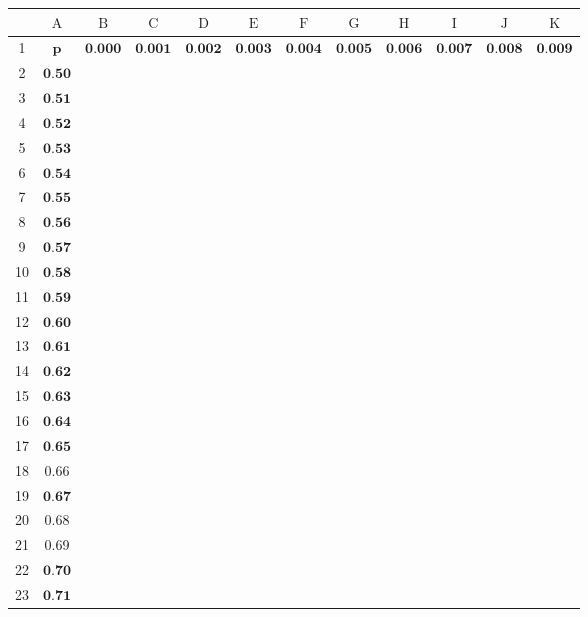\documentclass[10pt]{article}
\begin{document}
\begin{CJK*}{UTF8}{bsmi}
\begin{center}
\begin{tabular}{|c|c|c|c|c|c|c|c|c|c|c|c|}
\hline
 & $\mathrm{A}$ & $\mathrm{B}$ & $\mathrm{C}$ & $\mathrm{D}$ & $\mathrm{E}$ & $\mathrm{F}$ & $\mathrm{G}$ & $\mathrm{H}$ & $\mathrm{I}$ & $\mathrm{J}$ & $\mathrm{K}$ \\
\hline
1 & $\boldsymbol{p}$ & $\mathbf{0 . 0 0 0}$ & $\mathbf{0 . 0 0 1}$ & $\mathbf{0 . 0 0 2}$ & $\mathbf{0 . 0 0 3}$ & $\mathbf{0 . 0 0 4}$ & $\mathbf{0 . 0 0 5}$ & $\mathbf{0 . 0 0 6}$ & $\mathbf{0 . 0 0 7}$ & $\mathbf{0 . 0 0 8}$ & $\mathbf{0 . 0 0 9}$ \\
\hline
2 & $\mathbf{0 . 5 0}$ &  &  &  &  &  &  &  &  &  &  \\
\hline
3 & $\mathbf{0 . 5 1}$ &  &  &  &  &  &  &  &  &  &  \\
\hline
4 & $\mathbf{0 . 5 2}$ &  &  &  &  &  &  &  &  &  &  \\
\hline
5 & $\mathbf{0 . 5 3}$ &  &  &  &  &  &  &  &  &  &  \\
\hline
6 & $\mathbf{0 . 5 4}$ &  &  &  &  &  &  &  &  &  &  \\
\hline
7 & $\mathbf{0 . 5 5}$ &  &  &  &  &  &  &  &  &  &  \\
\hline
8 & $\mathbf{0 . 5 6}$ &  &  &  &  &  &  &  &  &  &  \\
\hline
9 & $\mathbf{0 . 5 7}$ &  &  &  &  &  &  &  &  &  &  \\
\hline
10 & $\mathbf{0 . 5 8}$ &  &  &  &  &  &  &  &  &  &  \\
\hline
11 & $\mathbf{0 . 5 9}$ &  &  &  &  &  &  &  &  &  &  \\
\hline
12 & $\mathbf{0 . 6 0}$ &  &  &  &  &  &  &  &  &  &  \\
\hline
13 & $\mathbf{0 . 6 1}$ &  &  &  &  &  &  &  &  &  &  \\
\hline
14 & $\mathbf{0 . 6 2}$ &  &  &  &  &  &  &  &  &  &  \\
\hline
15 & $\mathbf{0 . 6 3}$ &  &  &  &  &  &  &  &  &  &  \\
\hline
16 & $\mathbf{0 . 6 4}$ &  &  &  &  &  &  &  &  &  &  \\
\hline
17 & $\mathbf{0 . 6 5}$ &  &  &  &  &  &  &  &  &  &  \\
\hline
18 & 0.66 &  &  &  &  &  &  &  &  &  &  \\
\hline
19 & $\mathbf{0 . 6 7}$ &  &  &  &  &  &  &  &  &  &  \\
\hline
20 & 0.68 &  &  &  &  &  &  &  &  &  &  \\
\hline
21 & 0.69 &  &  &  &  &  &  &  &  &  &  \\
\hline
22 & $\mathbf{0 . 7 0}$ &  &  &  &  &  &  &  &  &  &  \\
\hline
23 & $\mathbf{0 . 7 1}$ &  &  &  &  &  &  &  &  &  &  \\
\hline
\end{tabular}
\end{center}


\end{CJK*}
\end{document}
